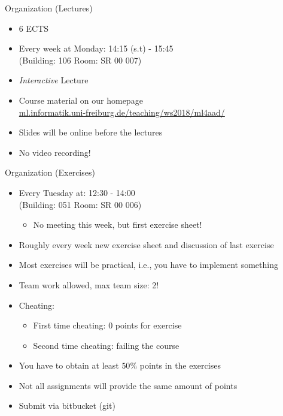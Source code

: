 \begin{frame}[c]{Organization (Lectures)}

\begin{itemize}
  \item $6$ ECTS
  \item Every week at Monday: 14:15 (s.t) - 15:45\\ (Building: 106 Room: SR 00 007)
  \item \emph{Interactive} Lecture 
  \item Course material on our homepage\\
  		{\small \url{ml.informatik.uni-freiburg.de/teaching/ws2018/ml4aad/}}
  \item Slides will be online before the lectures
  \item No video recording!
\end{itemize}


\end{frame}
\begin{frame}[c]{Organization (Exercises)}

\begin{itemize}
  \item Every Tuesday at: 12:30 - 14:00\\ (Building: 051 Room: SR 00 006)
  \begin{itemize}
    \item No meeting this week, but first exercise sheet!
  \end{itemize}
  \item Roughly every week new exercise sheet and discussion of last exercise
  \item Most exercises will be practical, i.e., you have to implement something
  \item Team work allowed, max team size: 2! 
  \item Cheating:
  \begin{itemize}
    \item First time cheating: $0$ points for exercise
    \item Second time cheating: failing the course
  \end{itemize}
  \item You have to obtain at least $50\%$ points in the exercises  
  \item Not all assignments will provide the same amount of points
  \item Submit via bitbucket (git)
\end{itemize}

\end{frame}
